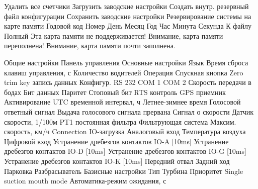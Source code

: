  {Удалить все счетчики}
 {Загрузить заводские настройки}
 {Создать внутр. резервный файл конфигурации}
 {Сохранить заводские настройки}
 {Резервирование системы на карте памяти}
 {Годовой код}
 {Номер}
 {День}
 {Месяц}
 {Год}
 {Час}
 {Минута}
 {Секунда}
 {К файлу}
 {Полный}
 {Эта карта памяти не поддерживается!}
 {Внимание, карта памяти переполнена!}
 {Внимание, карта памяти почти заполнена.}

 {Общие настройки}
 {Панель управления}
 {Основные настройки}
 {Язык}
 {Время сброса клавиш управления, с}
 {Количество водителей}
 {Операция}
 {Спускная кнопка}
 {\red Zero trim key}
 {запись данных}
 {Конфигур. RS 232}
 {COM 1}
 {COM 2}
 {Скорость передачи в бодах}
 {Бит данных}
 {Паритет}
 {Стоповый бит}
 {RTS контроль}
 {GPS приемник}
 {Активирование}
 {UTC временной интервал, ч}
 {Летнее-зимнее время}
 {Голосовой ответный сигнал}
 {Выдача голосового сигнала прервана}
 {Сигнал о скорости}
 {Датчик скорости, 1/100м}
 {PT1 постоянная фильтра}
 {Фильтрующая система}
 {Максим. скорость, км/ч}
 {\red Connection}
 {IO-загрузка}
 {Аналоговый вход}
 {Температура воздуха}
 {Цифровой вход}
 {Устранение дребезгов контактов IO-A [10ms]}
 {Устранение дребезгов контактов IO-D [10ms]}
 {Устранение дребезгов контактов IO-G [10ms]}
 {Устранение дребезгов контактов IO-K [10ms]}
 {Передний отвал}
 {Задний ход}
 {Парковка}
 {Разбрасыватель}
 {Базисные настройки}
 {Тип}
 {Турбина}
 {Приоритет}
 {\red Single suction mouth mode}
 {Автоматика-режим ожидания, с}
